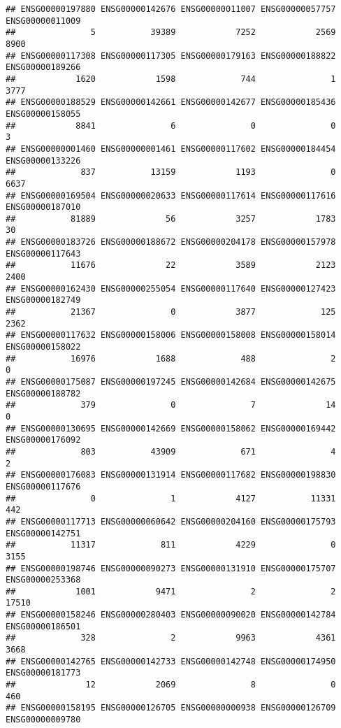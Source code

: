 \documentclass[
]{article}
\begin{document}
\begin{verbatim}
## ENSG00000197880 ENSG00000142676 ENSG00000011007 ENSG00000057757 ENSG00000011009 
##               5           39389            7252            2569            8900 
## ENSG00000117308 ENSG00000117305 ENSG00000179163 ENSG00000188822 ENSG00000189266 
##            1620            1598             744               1            3777 
## ENSG00000188529 ENSG00000142661 ENSG00000142677 ENSG00000185436 ENSG00000158055 
##            8841               6               0               0               3 
## ENSG00000001460 ENSG00000001461 ENSG00000117602 ENSG00000184454 ENSG00000133226 
##             837           13159            1193               0            6637 
## ENSG00000169504 ENSG00000020633 ENSG00000117614 ENSG00000117616 ENSG00000187010 
##           81889              56            3257            1783              30 
## ENSG00000183726 ENSG00000188672 ENSG00000204178 ENSG00000157978 ENSG00000117643 
##           11676              22            3589            2123            2400 
## ENSG00000162430 ENSG00000255054 ENSG00000117640 ENSG00000127423 ENSG00000182749 
##           21367               0            3877             125            2362 
## ENSG00000117632 ENSG00000158006 ENSG00000158008 ENSG00000158014 ENSG00000158022 
##           16976            1688             488               2               0 
## ENSG00000175087 ENSG00000197245 ENSG00000142684 ENSG00000142675 ENSG00000188782 
##             379               0               7              14               0 
## ENSG00000130695 ENSG00000142669 ENSG00000158062 ENSG00000169442 ENSG00000176092 
##             803           43909             671               4               2 
## ENSG00000176083 ENSG00000131914 ENSG00000117682 ENSG00000198830 ENSG00000117676 
##               0               1            4127           11331             442 
## ENSG00000117713 ENSG00000060642 ENSG00000204160 ENSG00000175793 ENSG00000142751 
##           11317             811            4229               0            3155 
## ENSG00000198746 ENSG00000090273 ENSG00000131910 ENSG00000175707 ENSG00000253368 
##            1001            9471               2               2           17510 
## ENSG00000158246 ENSG00000280403 ENSG00000090020 ENSG00000142784 ENSG00000186501 
##             328               2            9963            4361            3668 
## ENSG00000142765 ENSG00000142733 ENSG00000142748 ENSG00000174950 ENSG00000181773 
##              12            2069               8               0             460 
## ENSG00000158195 ENSG00000126705 ENSG00000000938 ENSG00000126709 ENSG00000009780 

\end{verbatim}
\end{document}
